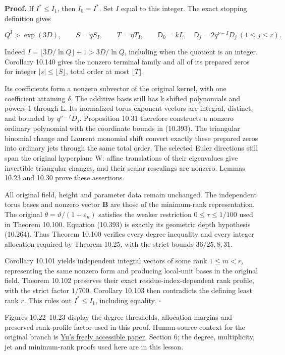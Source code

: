 \documentclass[
  11pt,
  a4paper,
]{article}
\begin{document}
\textbf{Proof.} If \(I^*\le I_1\), then \(I_0=I^*\). Set \(I\) equal to
this integer. The exact stopping definition gives

\[
Q^I>\exp(3D),\qquad
\overline S=qS_I,\qquad \overline T=\eta T_I,
\qquad
\mathsf D_0=kL,\quad
\mathsf D_j=2q^{\nu-I}D_j\ (1\le j\le r).
\tag{10.393}
\]

Indeed \(I=\lfloor3D/\ln Q\rfloor+1>3D/\ln Q\), including when the
quotient is an integer. Corollary 10.140 gives the nonzero terminal
family and all of its prepared zeros for integer
\(|s|\le\lfloor\overline S\rfloor\), total order at most
\(\lfloor\overline T\rfloor\).

Its coefficients form a nonzero subvector of the original kernel, with
one coefficient attaining \(\delta\). The additive basis still has k
shifted polynomials and powers 1 through L. Its normalized torus
exponent vectors are integral, distinct, and bounded by
\(q^{\nu-I}D_j\). Proposition 10.31 therefore constructs a nonzero
ordinary polynomial with the coordinate bounds in (10.393). The
triangular binomial change and Laurent monomial shift convert exactly
these prepared zeros into ordinary jets through the same total order.
The selected Euler directions still span the original hyperplane W:
affine translations of their eigenvalues give invertible triangular
changes, and their scalar rescalings are nonzero. Lemmas 10.23 and 10.30
prove these assertions.

All original field, height and parameter data remain unchanged. The
independent torus bases and nonzero vector \(\boldsymbol B\) are those
of the minimum-rank representation. The original
\(\theta=\vartheta/(1+\varepsilon_n)\) satisfies the weaker restriction
\(0\le\tau\le1/100\) used in Theorem 10.100. Equation (10.393) is
exactly its geometric depth hypothesis (10.264). Thus Theorem 10.100
verifies every degree inequality and every integer allocation required
by Theorem 10.25, with the strict bounds \(36/25,8,31\).

Corollary 10.101 yields independent integral vectors of some rank
\(1\le m<r\), representing the same nonzero form and producing
local-unit bases in the original field. Theorem 10.102 preserves their
exact residue-index-dependent rank profile, with the strict factor
\(1/700\). Corollary 10.103 then contradicts the defining least rank
\(r\). This rules out \(I^*\le I_1\), including equality. \(\square\)

Figures 10.22--10.23 display the degree thresholds, allocation margins
and preserved rank-profile factor used in this proof. Human-source
context for the original branch is
\href{https://archive.ymsc.tsinghua.edu.cn/pacm_download/117/6782-11511_2013_Article_106.pdf}{Yu's
freely accessible paper}, Section 6; the degree, multiplicity, jet and
minimum-rank proofs used here are in this lesson.
\end{document}
